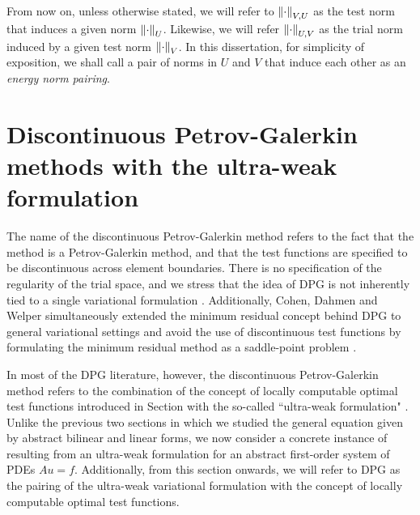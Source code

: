 From now on, unless otherwise stated, we will refer to $\nor{\cdot}_{V,U}$ as the test norm that induces a given norm $\nor{\cdot}_U$. Likewise, we will refer $\nor{\cdot}_{U,V}$ as the trial norm induced by a given test norm $\nor{\cdot}_V$. In this dissertation, for simplicity of exposition, we shall call a pair of norms in $U$ and $V$ that induce each other as an {\em energy norm pairing}.

\section{Discontinuous Petrov-Galerkin methods with the ultra-weak formulation}

The name of the discontinuous Petrov-Galerkin method refers to the fact that the method is a Petrov-Galerkin method, and that the test functions are specified to be discontinuous across element boundaries. There is no specification of the regularity of the trial space, and we stress that the idea of DPG is not inherently tied to a single variational formulation \cite{Bui-ThanhDemkowiczGhattas11a}. Additionally, Cohen, Dahmen and Welper simultaneously extended the minimum residual concept behind DPG to general variational settings and avoid the use of discontinuous test functions by formulating the minimum residual method as a saddle-point problem \cite{DahmenVariationalStabilization}.  

In most of the DPG literature, however, the discontinuous Petrov-Galerkin method refers to the combination of the concept of locally computable optimal test functions introduced in Section  with the so-called ``ultra-weak formulation" \cite{DPG1,DPG2,DPG3,DPG4,DPGElas,DBLP:journals/procedia/NiemiCC11}. Unlike the previous two sections in which we studied the general equation  given by abstract bilinear and linear forms, we now consider a concrete instance of  resulting from an ultra-weak formulation for an abstract first-order system of PDEs $Au = f$. Additionally, from this section onwards, we will refer to DPG as the pairing of the ultra-weak variational formulation with the concept of locally computable optimal test functions. 

